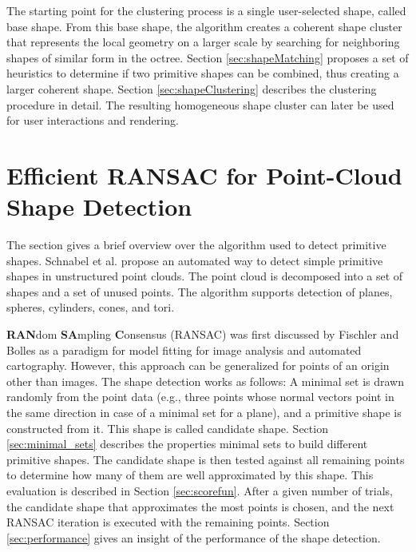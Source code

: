 The starting point for the clustering process is a single user-selected shape, called base shape. From this base shape, the algorithm creates a coherent shape cluster that represents the local geometry on a larger scale by searching for neighboring shapes of similar form in the octree. Section \ref{sec:shapeMatching} proposes a set of heuristics to determine if two primitive shapes can be combined, thus creating a larger coherent shape. 
Section \ref{sec:shapeClustering} describes the clustering procedure in detail. The resulting homogeneous shape cluster can later be used for user interactions and rendering. 


\section{Efficient RANSAC for Point-Cloud Shape Detection}

\label{sec:schnabel}

The section gives a brief overview over the algorithm used to detect primitive shapes. 
Schnabel et al. \cite{schnabel-2007-efficient} propose an automated way to detect simple primitive shapes in unstructured point clouds. The point cloud is decomposed into a set of shapes and a set of unused points. The algorithm supports detection of planes, spheres, cylinders, cones, and tori. 

\par

\textbf{RAN}dom \textbf{SA}mpling \textbf{C}onsensus (RANSAC) was first discussed by Fischler and Bolles \cite{fischler1981random} as a paradigm for model fitting for image analysis and automated cartography. However, this approach can be generalized for points of an origin other than images. The shape detection works as follows: A minimal set is drawn randomly from the point data (e.g., three points whose normal vectors point in the same direction in case of a minimal set for a plane), and a primitive shape is constructed from it. This shape is called candidate shape. Section \ref{sec:minimal_sets} describes the properties minimal sets to build different primitive shapes. The candidate shape is then tested against all remaining points to determine how many of them are well approximated by this shape. This evaluation is described in Section \ref{sec:scorefun}. After a given number of trials, the candidate shape that approximates the most points is chosen, and the next RANSAC iteration is executed with the remaining points. Section \ref{sec:performance} gives an insight of the performance of the shape detection. 


